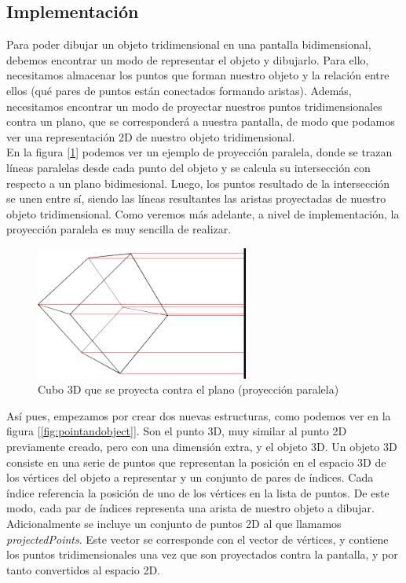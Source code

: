 \subsection{Implementación}

Para poder dibujar un objeto tridimensional en una pantalla bidimensional, debemos encontrar un modo de representar el objeto y dibujarlo. Para ello, necesitamos almacenar los puntos que forman nuestro objeto y la relación entre ellos (qué pares de puntos están conectados formando aristas). Además, necesitamos encontrar un modo de proyectar nuestros puntos tridimensionales contra un plano, que se corresponderá a nuestra pantalla, de modo que podamos ver una representación 2D de nuestro objeto tridimensional.\\

En la figura [\ref{fig:projection}] podemos ver un ejemplo de proyección paralela, donde se trazan líneas paralelas desde cada punto del objeto y se calcula su intersección con respecto a un plano bidimesional. Luego, los puntos resultado de la intersección se unen entre sí, siendo las líneas resultantes las aristas proyectadas de nuestro objeto tridimensional. Como veremos más adelante, a nivel de implementación, la proyección paralela es muy sencilla de realizar.\\

\begin{figure}[h]
	\centering
	\includegraphics[width=7cm]{archivos/projection}
	\caption{Cubo 3D que se proyecta contra el plano (proyección paralela)}
	\label{fig:projection}
\end{figure}

Así pues, empezamos por crear dos nuevas estructuras, como podemos ver en la figura [\ref{fig:pointandobject}]. Son el punto 3D, muy similar al punto 2D previamente creado, pero con una dimensión extra, y el objeto 3D. Un objeto 3D consiste en una serie de puntos que representan la posición en el espacio 3D de los vértices del objeto a representar y un conjunto de pares de índices. Cada índice referencia la posición de uno de los vértices en la lista de puntos. De este modo, cada par de índices representa una arista de nuestro objeto a dibujar. Adicionalmente se incluye un conjunto de puntos 2D al que llamamos \emph{projectedPoints}. Este vector se corresponde con el vector de vértices, y contiene los puntos tridimensionales una vez que son proyectados contra la pantalla, y por tanto convertidos al espacio 2D.\\

